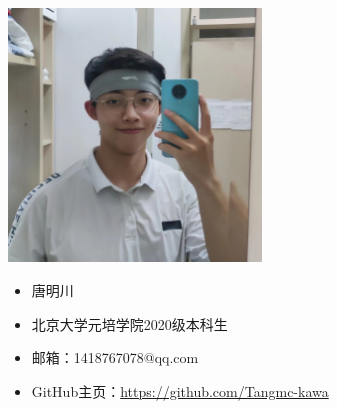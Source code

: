 \begin{figure}[ht]
    \hfill
    \begin{minipage}[c]{0.4\textwidth}
        \includegraphics[width=0.6\textwidth]{./image/author-tmc.jpg}
    \end{minipage}
    \hfil
    \begin{minipage}[c]{0.5\textwidth}
        \begin{itemize}
            \item 唐明川
            \item 北京大学元培学院2020级本科生
            \item 邮箱：1418767078@qq.com
            \item GitHub主页：\href{https://github.com/Tangmc-kawa}{https://github.com/Tangmc-kawa}
        \end{itemize}
    \end{minipage}
    \vspace{0.5cm}


\end{figure}
